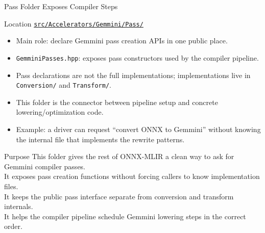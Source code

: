 \documentclass[aspectratio=169,10pt]{beamer}
\newcommand{\code}[1]{\texttt{\footnotesize #1}}
\newcommand{\repoRoot}{/home/lahcen/toolchains/onnx-mlir-xcompile/onnx-mlir}
\newcommand{\pathcode}[1]{\href{run:\repoRoot/#1}{\texttt{\scriptsize #1}}}
\begin{document}
\begin{frame}{Pass Folder Exposes Compiler Steps}
  \begin{block}{Location}
    \pathcode{src/Accelerators/Gemmini/Pass/}
  \end{block}
  \begin{itemize}
    \item Main role: declare Gemmini pass creation APIs in one public place.
    \item \code{GemminiPasses.hpp}: exposes pass constructors used by the compiler pipeline.
    \item Pass declarations are not the full implementations; implementations live in \code{Conversion/} and \code{Transform/}.
    \item This folder is the connector between pipeline setup and concrete lowering/optimization code.
    \item Example: a driver can request ``convert ONNX to Gemmini'' without knowing the internal file that implements the rewrite patterns.
  \end{itemize}
  \begin{block}{Purpose}
    This folder gives the rest of ONNX-MLIR a clean way to ask for Gemmini compiler passes.\\
    It exposes pass creation functions without forcing callers to know implementation files.\\
    It keeps the public pass interface separate from conversion and transform internals.\\
    It helps the compiler pipeline schedule Gemmini lowering steps in the correct order.
  \end{block}
\end{frame}
\end{document}
